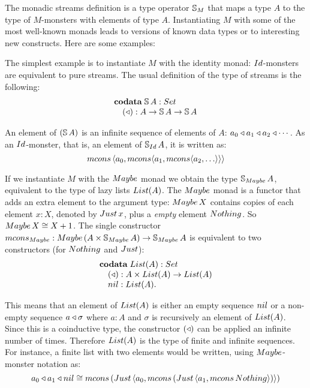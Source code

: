 The monadic streams definition is a type operator $\mathbb{S}_{M}$ that maps a type $A$ to the type of $M$-monsters with elements of type $A$.
Instantiating $M$ with some of the most well-known monads leads to versions of known data types or to interesting new constructs.
Here are some examples:

\begin{example}
The simplest example is to instantiate $M$ with the identity monad:
$\Id$-monsters are equivalent to pure streams.
The usual definition of the type of streams is the following:
$$
\begin{array}[t]{l}
\codata\;
\strsym\,A:\set\\
\quad (\scons): A\rightarrow \strsym\,A \rightarrow\strsym\,A
\end{array}
$$

An element of $(\mathbb{S}\,A)$ is an infinite sequence of elements of $A$: $a_0 \triangleleft a_1\triangleleft a_2\triangleleft \cdots$.
As an $\Id$-monster, that is, an element of $\stream{\Id}\,A$, it is written as:
$$
\mcons\,\langle a_0,\mcons \langle a_1, \mcons \langle a_2, \ldots \rangle \rangle \rangle
$$
\end{example}

\begin{example}
If we instantiate $M$ with the $\maybe$ monad we obtain the type $\stream{\maybe}\,A$, equivalent to the type of lazy lists $\lst{A}$.
The $\maybe$ monad is a functor that adds an extra element to the argument type:
$\maybe\,X$ contains copies of each element $x:X$, denoted by $\just\,x$, plus a {\em empty} element $\nothing$.
So $\maybe\,X \cong X+1$.
The single constructor $\mcons_\maybe: \maybe\,(A\times \stream{\maybe}\,A)\rightarrow\stream{\maybe}\,A$ is equivalent to two constructors (for $\nothing$ and $\just$):
$$
\begin{array}[t]{l}
\codata\;
\lst{A}:\set\\
\quad (\scons): A\times \lst{A}\rightarrow\lst{A}\\
\quad \nil: \lst{A}.
\end{array}
$$

This means that an element of $\lst{A}$ is either an empty sequence $\nil$ or a non-empty sequence $a\triangleleft \sigma$ where $a:A$ and $\sigma$ is recursively an element of $\lst{A}$.
Since this is a coinductive type, the constructor $(\triangleleft)$ can be applied an infinite number of times.
Therefore $\lst{A}$ is the type of finite and infinite sequences.
For instance, a finite list with two elements would be written, using $\maybe$-monster notation as:
$$
a_0 \scons a_1\scons \nil \cong
\mcons\, (\just\,\langle a_0, 
  \mcons\, (\just\,\langle a_1,
    \mcons\,\nothing\rangle) \rangle)
$$
\end{example}

